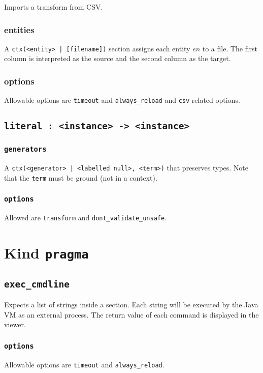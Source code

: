 \documentclass[10pt]{book}
\begin{document}
Imports a transform from CSV.  

\subsection{entities}
A {\tt ctx(<entity> | [filename])} section assigns each entity $en$ to a file.  The first column is interpreted as the source and the second column as the target.


\subsection{options}
Allowable options are {\tt timeout} and {\tt always\_reload}  and {\tt csv} related options. 

\section{{\tt literal : <instance> -> <instance>}}

\subsection{{\tt generators}}
A {\tt ctx(<generator> | <labelled null>, <term>)} that preserves types.  Note that the {\tt term} must be ground (not in a context).  

\subsection{{\tt options}}
Allowed are {\tt transform} and {\tt dont\_validate\_unsafe}.

\chapter{Kind {\tt pragma}}
\section{{\tt exec\_cmdline}}
Expects a list of strings inside a section.  Each string will be executed by the Java VM as an external process.  The return value of each command is displayed in the viewer.

\subsection{{\tt options}}

Allowable options are {\tt timeout} and {\tt always\_reload}.
\end{document}
